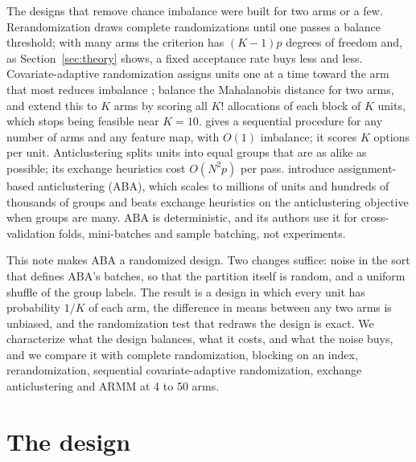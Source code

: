 \documentclass[11pt]{article}
\theoremstyle{remark}
\begin{document}
The designs that remove chance imbalance were built for two arms or a few.
Rerandomization \citep{morgan2012,li2018} draws complete randomizations until
one passes a balance threshold; with many arms the criterion has $(K-1)p$
degrees of freedom and, as Section~\ref{sec:theory} shows, a fixed
acceptance rate buys less and less. Covariate-adaptive randomization assigns
units one at a time toward the arm that most reduces imbalance
\citep{pocock1975,hu2012}; \citet{qin2024} balance the Mahalanobis distance
for two arms, and \citet{yang2023} extend this to $K$ arms by scoring all
$K!$ allocations of each block of $K$ units, which stops being feasible near
$K = 10$. \citet{zhang2023} gives a sequential procedure for any number of
arms and any feature map, with $O(1)$ imbalance; it scores $K$ options per
unit. Anticlustering \citep{papenberg2021,papenberg2026} splits units into
equal groups that are as alike as possible; its exchange heuristics cost
$O(N^2 p)$ per pass. \citet{baumann2026} introduce assignment-based
anticlustering (ABA), which scales to millions of units and hundreds of
thousands of groups and beats exchange heuristics on the anticlustering
objective when groups are many. ABA is deterministic, and its authors use it
for cross-validation folds, mini-batches and sample batching, not
experiments.

This note makes ABA a randomized design. Two changes suffice: noise in the
sort that defines ABA's batches, so that the partition itself is random, and
a uniform shuffle of the group labels. The result is a design in which every
unit has probability $1/K$ of each arm, the difference in means between any
two arms is unbiased, and the randomization test that redraws the design is
exact. We characterize what the design balances, what it costs, and what the
noise buys, and we compare it with complete randomization, blocking on an
index, rerandomization, sequential covariate-adaptive randomization, exchange
anticlustering and ARMM at 4 to 50 arms.

\section{The design}\label{sec:design}
\end{document}
